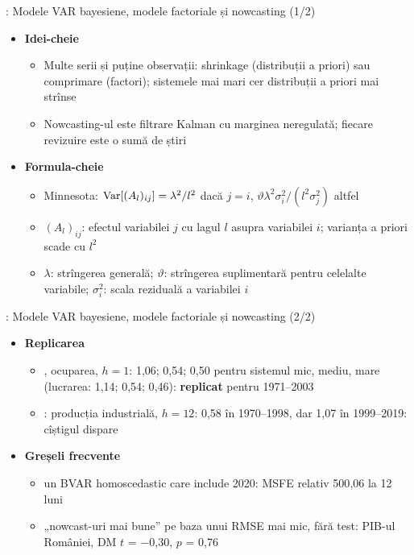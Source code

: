\begin{frame}{: Modele VAR bayesiene, modele factoriale și nowcasting (1/2)}
\itemsize{\footnotesize}
\begin{itemize}
    \item \textbf{Idei-cheie}
    \begin{itemize}
        \item Multe serii și puține observații: shrinkage (distribuții a priori) sau comprimare (factori); sistemele mai mari cer distribuții a priori mai strînse
        \item Nowcasting-ul este filtrare Kalman cu marginea neregulată; fiecare revizuire este o sumă de știri
    \end{itemize}
    \item \textbf{Formula-cheie}
    \begin{itemize}
        \item Minnesota: $\text{Var}[(A_l)_{ij}] = \lambda^2/l^2$ dacă $j = i$, $\vartheta\lambda^2\sigma_i^2/(l^2\sigma_j^2)$ altfel
        \item $(A_l)_{ij}$: efectul variabilei $j$ cu lagul $l$ asupra variabilei $i$; varianța a priori scade cu $l^2$
        \item $\lambda$: strîngerea generală; $\vartheta$: strîngerea suplimentară pentru celelalte variabile; $\sigma_i^2$: scala reziduală a variabilei $i$
    \end{itemize}
\end{itemize}
\end{frame}

\begin{frame}{: Modele VAR bayesiene, modele factoriale și nowcasting (2/2)}
\itemsize{\small}
\begin{itemize}
    \item \textbf{Replicarea}
    \begin{itemize}
        \item {}, ocuparea, $h = 1$: 1{,}06; 0{,}54; 0{,}50 pentru sistemul mic, mediu, mare (lucrarea: 1{,}14; 0{,}54; 0{,}46): \textbf{replicat} pentru 1971--2003
        \item {}: producția industrială, $h = 12$: 0{,}58 în 1970--1998, dar 1{,}07 în 1999--2019: cîștigul dispare
    \end{itemize}
    \item \textbf{Greșeli frecvente}
    \begin{itemize}
        \item un BVAR homoscedastic care include 2020: MSFE relativ 500{,}06 la 12 luni
        \item „nowcast-uri mai bune” pe baza unui RMSE mai mic, fără test: PIB-ul României, DM $t$ = \ensuremath{-}0{,}30, $p$ = 0{,}76
    \end{itemize}
\end{itemize}
\end{frame}


